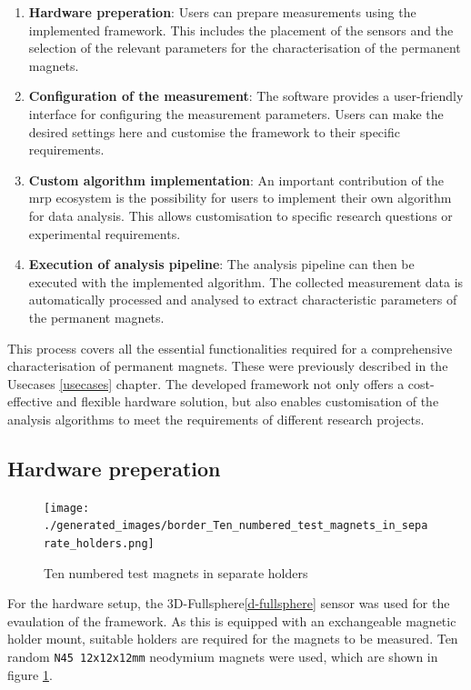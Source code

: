 \begin{enumerate}
\def\labelenumi{\arabic{enumi}.}
\item
  \textbf{Hardware preperation}: Users can prepare measurements using
  the implemented framework. This includes the placement of the sensors
  and the selection of the relevant parameters for the characterisation
  of the permanent magnets.
\item
  \textbf{Configuration of the measurement}: The software provides a
  user-friendly interface for configuring the measurement parameters.
  Users can make the desired settings here and customise the framework
  to their specific requirements.
\item
  \textbf{Custom algorithm implementation}: An important contribution of
  the \gls{mrp} ecosystem is the possibility for users to implement
  their own algorithm for data analysis. This allows customisation to
  specific research questions or experimental requirements.
\item
  \textbf{Execution of analysis pipeline}: The analysis pipeline can
  then be executed with the implemented algorithm. The collected
  measurement data is automatically processed and analysed to extract
  characteristic parameters of the permanent magnets.
\end{enumerate}

This process covers all the essential functionalities required for a
comprehensive characterisation of permanent magnets. These were
previously described in the Usecases \ref{usecases} chapter. The
developed framework not only offers a cost-effective and flexible
hardware solution, but also enables customisation of the analysis
algorithms to meet the requirements of different research projects.

\hypertarget{hardware-preperation}{%
\subsection{Hardware preperation}\label{hardware-preperation}}

\begin{figure}
\centering
\texttt{[image: ./generated\_images/border\_Ten\_numbered\_test\_magnets\_in\_separate\_holders.png]}
\caption{Ten numbered test magnets in separate holders
\label{Ten_numbered_test_magnets_in_separate_holders.png}}
\end{figure}

For the hardware setup, the 3D-Fullsphere\ref{d-fullsphere} sensor was
used for the evaulation of the framework. As this is equipped with an
exchangeable magnetic holder mount, suitable holders are required for
the magnets to be measured. Ten random
\passthrough{\lstinline!N45 12x12x12mm!} neodymium magnets were used,
which are shown in figure
\ref{Ten_numbered_test_magnets_in_separate_holders.png}.

